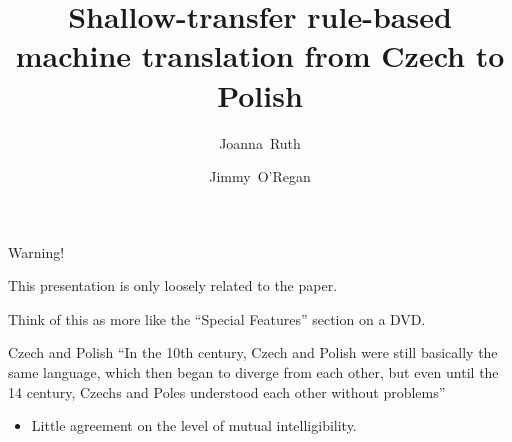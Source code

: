 \documentclass{beamer}
\title[Czech to Polish]{Shallow-transfer rule-based machine translation from Czech to Polish}
\author[Ruth, O'Regan] %
{Joanna~Ruth\inst{1} \and Jimmy~O'Regan\inst{2}}
\institute
{
  \inst{1}%
  Gda\'{n}sk University of Technology \\
  Gda\'{n}sk \\
  Poland \\
  {\tt joannaruth1@gmail.com}
  \and
  \inst{2}%
  Eolaistriu Technologies \\
  Thurles \\
  Ireland \\  
  {\tt joregan@gmail.com}
}
\date{}
\begin{document}
\begin{frame}
\titlepage
\end{frame}

\begin{frame}{Warning!}

This presentation is only loosely related to the paper.

Think of this as more like the ``Special Features'' 
section on a DVD.

\end{frame}

\begin{frame}{Czech and Polish}
``In the 10th century, Czech and Polish were still basically the same language, 
which then began to diverge from each other, but even until the 14 century, 
Czechs and Poles understood each other without problems''

\pause

\begin{itemize}
\item Little agreement on the level of mutual intelligibility.
\end{itemize}

\end{frame}
\end{document}
